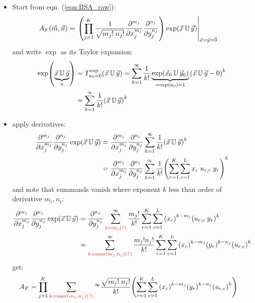 \documentclass[
	english,
	a4paper,
	fontsize=10pt,
	parskip=half,
	titlepage=true,
	DIV=12,
	final
]{scrreprt}
\begin{document}
\begin{itemize}
\item Start from eqn. (\ref{eqn:BSA_raw}):
\begin{align*}
	A_F(\vec{m}, \vec{n})
&=
	\eval{\qty(
		\prod_{j=1}^{K}
			\frac
				{1}
				{\sqrt{m_j! \; n_j!}}
			\pdv[m_j]{x_j}
			\pdv[n_j]{y_j}
		) \exp(\vec{x} \, \mathbb{U} \, \vec{y})
	}_{\vec{x} = \vec{y} = \vec{0}}
\end{align*}
and write $\exp$ as its Taylor expansion:
\begin{align}
	\exp
	( \underbrace{\vec{x} \, \mathbb{U} \, \vec{y}}_{a} )
&=
	T_{a_0 = 0}^{\exp} ( \vec{x} \, \mathbb{U} \, \vec{y} )
=
	\sum_{k=1}^{\infty}
		\frac{1}{k!}
		\underbrace{ \exp( \vec{x}_0 \, \mathbb{U} \, \vec{y}_0 ) }_{=\exp(a_0) = 1}
		\qty( \vec{x} \, \mathbb{U} \, \vec{y} - 0 )^{k}
	\\
&=
	\sum_{k=1}^{\infty}
		\frac{1}{k!}
		\qty( \vec{x} \, \mathbb{U} \, \vec{y} )^{k}
\end{align}

\item apply derivatives:
\begin{align}
	\pdv[m_j]{x_j}
	\pdv[n_j]{y_j}
	\exp(\vec{x} \, \mathbb{U} \, \vec{y})
&=
	\pdv[m_j]{x_j}
	\pdv[n_j]{y_j}
	\sum_{k=1}^{\infty}
		\frac{1}{k!}
		\qty( \vec{x} \, \mathbb{U} \, \vec{y} )^{k}
	\\
&=
	\pdv[m_j]{x_j}
	\pdv[n_j]{y_j}
	\sum_{k=1}^{\infty}
		\frac{1}{k!}
		\qty( 
			\sum_{r=1}^{K}
			\sum_{c=1}^{L}
			x_c \; u_{r,c} \; y_r
		)^{k}
\end{align}
and note that summands vanish where exponent $k$ less than order of derivative $m_i, n_i$:
\begin{align}
	\pdv[m_j]{x_j}
	\pdv[n_j]{y_j}
	\exp(\vec{x} \, \mathbb{U} \, \vec{y})
&=
	\pdv[n_j]{y_j}
	\sum^{\infty}_{\color{red} k=m_j (?)}
		\frac{m_j !}{k!}
			\sum_{r=1}^{K}
			\sum_{c=1}^{L}
		\qty(x_c)^{k - m_j}
		\qty(u_{r,c} \; y_r)^{k}
	\\
&=
	\sum^{\infty}_{\color{red} k=\max(m_j, n_j) (?)}
		\frac{m_j ! n_j !}{k!}
			\sum_{r=1}^{K}
			\sum_{c=1}^{L}
				\qty(x_c)^{k - m_j}
				\qty(y_r)^{k - n_j}
				\qty(u_{r,c})^{k}
\end{align}
get:
\begin{align}
	A_F
&=
	\prod_{j=1}^{K}
	\sum_{\color{red} k=\max(m_j, n_j) (?)}^{\infty}
		\frac
			{\sqrt{m_j! \; n_j!}}
			{k!}
		\qty( 
			\sum_{r=1}^{K}
			\sum_{c=1}^{L}
				\qty(x_c)^{k - m_j}
				\qty(y_r)^{k - n_j}
				\qty(u_{r,c})^{k}
		)
\end{align}


\end{itemize}
\end{document}
